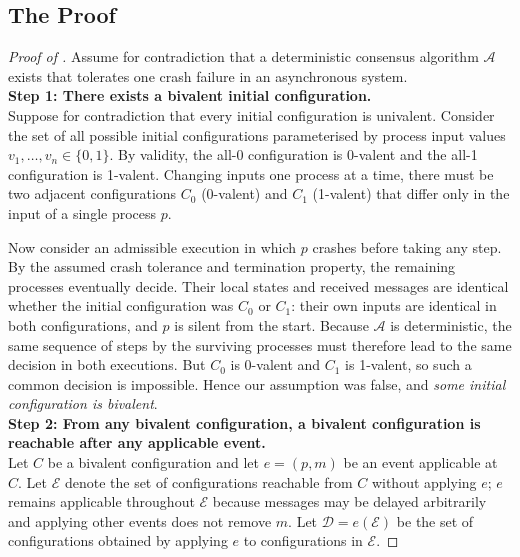 \subsection{The Proof}

\vspace{18pt}

\begin{proof}[Proof of ]
Assume for contradiction that a deterministic consensus algorithm $\mathcal{A}$ exists that tolerates one crash failure in an asynchronous system.
\\[20pt]
\textbf{Step 1: There exists a bivalent initial configuration.}
\\

Suppose for contradiction that every initial configuration is univalent. Consider the set of all possible initial configurations parameterised by process input values $v_1,\ldots,v_n\in\{0,1\}$. By validity, the all-0 configuration is 0-valent and the all-1 configuration is 1-valent. Changing inputs one process at a time, there must be two adjacent configurations $C_0$ (0-valent) and $C_1$ (1-valent) that differ only in the input of a single process $p$.

Now consider an admissible execution in which $p$ crashes before taking any step. By the assumed crash tolerance and termination property, the remaining processes eventually decide. Their local states and received messages are identical whether the initial configuration was $C_0$ or $C_1$: their own inputs are identical in both configurations, and $p$ is silent from the start. Because $\mathcal{A}$ is deterministic, the same sequence of steps by the surviving processes must therefore lead to the same decision in both executions. But $C_0$ is 0-valent and $C_1$ is 1-valent, so such a common decision is impossible. Hence our assumption was false, and \emph{some initial configuration is bivalent}.
\\[12pt]
\textbf{Step 2: From any bivalent configuration, a bivalent configuration is reachable after any applicable event.}
\\

Let $C$ be a bivalent configuration and let $e=(p,m)$ be an event applicable at $C$. Let $\mathcal{E}$ denote the set of configurations reachable from $C$ without applying $e$; $e$ remains applicable throughout $\mathcal{E}$ because messages may be delayed arbitrarily and applying other events does not remove $m$. Let $\mathcal{D}=e(\mathcal{E})$ be the set of configurations obtained by applying $e$ to configurations in $\mathcal{E}$.


\end{proof}
